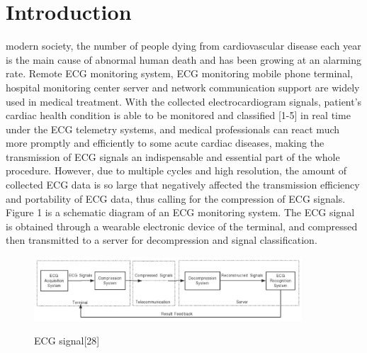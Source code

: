 \documentclass[journal]{IEEEtran}
\begin{document}
\section{Introduction}
 modern society, the number of people dying from cardiovascular disease each year is the main cause of abnormal human death and has been growing at an alarming rate. Remote ECG monitoring system, ECG monitoring mobile phone terminal, hospital monitoring center server and network communication support are widely used in medical treatment. With the collected electrocardiogram signals, patient's cardiac health condition is able to be monitored and classified [1-5] in real time under the ECG telemetry systems, and medical professionals can react much more promptly and efficiently to some acute cardiac diseases, making the transmission of ECG signals an indispensable and essential part of the whole procedure. However, due to multiple cycles and high resolution, the amount of collected ECG data is so large that negatively affected the transmission efficiency and portability of ECG data, thus calling for the compression of ECG signals. Figure 1 is a schematic diagram of an ECG monitoring system. The ECG signal is obtained through a wearable electronic device of the terminal, and compressed then transmitted to a server for decompression and signal classification.

\begin{figure}[H]
	\centering
	\includegraphics[width=10cm]{SysModel.pdf}\\
	\caption{ECG signal[28]}
	\label{Doc1}
\end{figure}
\end{document}
